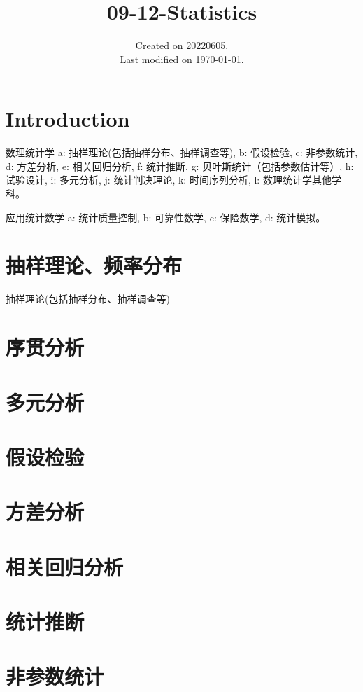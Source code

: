 \documentclass[UTF8]{../09-Mathematics}
\begin{document}
\title{09-12-Statistics}
\date{Created on 20220605.\\   Last modified on \today.}
\maketitle
\tableofcontents


\chapter{Introduction}



数理统计学
a: 抽样理论(包括抽样分布、抽样调查等), 
b: 假设检验, 
c: 非参数统计, 
d: 方差分析, 
e: 相关回归分析, 
f: 统计推断, 
g: 贝叶斯统计（包括参数估计等）, 
h: 试验设计, 
i: 多元分析, 
j: 统计判决理论, 
k: 时间序列分析, 
l: 数理统计学其他学科。

应用统计数学
a: 统计质量控制, b: 可靠性数学, c: 保险数学, d: 统计模拟。





\chapter{抽样理论、频率分布}
抽样理论(包括抽样分布、抽样调查等)


\chapter{序贯分析}
\chapter{多元分析}


\chapter{假设检验}
\chapter{方差分析}
\chapter{相关回归分析}
\chapter{统计推断}


\chapter{非参数统计}
\end{document}

